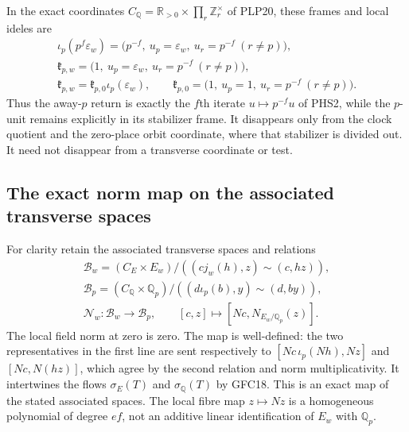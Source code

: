 In the exact coordinates $C_{\mathbb Q}=\mathbb R_{>0}\times
\prod_r\mathbb Z_r^\times$ of PLP20, these frames and local ideles are
\begin{equation}\tag{GFC20}
 \begin{gathered}
 \iota_p(p^f\varepsilon_w)
  =\bigl(p^{-f},\ u_p=\varepsilon_w,
                         \ u_r=p^{-f}\ (r\ne p)\bigr),\\
 \mathfrak{k}_{p,w}
  =\bigl(1,\ u_p=\varepsilon_w,
                         \ u_r=p^{-f}\ (r\ne p)\bigr),\\
 \mathfrak{k}_{p,w}=\mathfrak{k}_{p,0}\iota_p(\varepsilon_w),\qquad
 \mathfrak{k}_{p,0}=\bigl(1,\ u_p=1,
                         \ u_r=p^{-f}\ (r\ne p)\bigr).
 \end{gathered}
\end{equation}
Thus the away-$p$ return is exactly the $f$th iterate $u\mapsto
p^{-f}u$ of PHS2, while the $p$-unit remains explicitly in its
stabilizer frame. It disappears only from the clock quotient and
the zero-place orbit coordinate, where that stabilizer is divided
out. It need not disappear from a transverse coordinate or test.

\subsection{The exact norm map on the associated transverse spaces}

For clarity retain the associated transverse spaces and relations
\begin{equation}\tag{GFC21}
 \begin{gathered}
 \mathcal B_w=(C_E\times E_w)/
       ((c j_w(h),z)\sim(c,hz)),\\
 \mathcal B_p=(C_{\mathbb Q}\times\mathbb Q_p)/
       ((d\iota_p(b),y)\sim(d,by)),\\
 \mathcal N_w:\mathcal B_w\longrightarrow\mathcal B_p,
 \qquad[c,z]\longmapsto[Nc,N_{E_w/\mathbb Q_p}(z)].
 \end{gathered}
\end{equation}
The local field norm at zero is zero. The map is well-defined:
the two representatives in the first line are sent respectively
to $[Nc\,\iota_p(Nh),Nz]$ and $[Nc,N(hz)]$, which agree by the
second relation and norm multiplicativity. It intertwines the
flows $\sigma_E(T)$ and $\sigma_{\mathbb Q}(T)$ by GFC18.
This is an exact map of the stated associated spaces. The local
fibre map $z\mapsto Nz$ is a homogeneous polynomial of degree
$ef$, not an additive linear identification of $E_w$ with
$\mathbb Q_p$.

